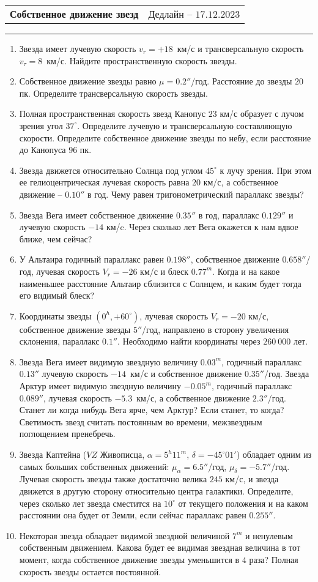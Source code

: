 \documentclass[12pt]{article}
\begin{document}
 \begin{tabularx}{\textwidth}{Xr}
  {\Large \textbf{Собственное движение звезд}} & Дедлайн -- $17.12.2023$ \\
 \end{tabularx}
 \noindent\rule{\textwidth}{0.4pt}
 \begin{enumerate}
        \item Звезда имеет лучевую скорость $v_r=+18$~км/с и трансверсальную скорость $v_{\tau}=8$~км/с. Найдите пространственную скорость звезды.
        \item Собственное движение звезды равно $\mu=0.2''$/год. Расстояние до звезды $20$ пк. Определите трансверсальную скорость звезды.
        \item Полная пространственная скорость звезд Канопус $23$ км/с образует с лучом зрения угол $37^{\circ}$. Определите лучевую и трансверсальную составляющую скорости. Определите собственное движение звезды по небу, если расстояние до Канопуса  $96$ пк.
        \item Звезда движется относительно Солнца под углом $45^{\circ}$ к лучу зрения. При этом ее гелиоцентрическая лучевая скорость равна $20$ км/с, а собственное движение -- $0.10''$ в год. Чему равен тригонометрический параллакс звезды?
        \item Звезда Вега имеет собственное движение $0.35''$ в год, параллакс $0.129''$ и лучевую скорость $-14$ км/c. Через сколько лет Вега окажется к нам вдвое ближе, чем сейчас?
        \item У Альтаира годичный параллакс равен $0.198''$, собственное движение $0.658''$/год, лучевая скорость $V_r =- 26$ км/с и блеск $0.77^m$. Когда и на какое наименьшее расстояние Альтаир сблизится с Солнцем, и каким будет тогда его видимый блеск?
        \item Координаты звезды $(0^h, +60^{\circ})$, лучевая скорость $V_r=-20$ км/с, собственное движение звезды $5''$/год, направлено в сторону увеличения склонения, параллакс $0.1''$. Необходимо найти координаты через $260~000$ лет.
        \item Звезда Вега имеет видимую звездную величину $0.03^m$, годичный параллакс $0.13''$ лучевую скорость $-14$~км/с и собственное движение $0.35''$/год. Звезда Арктур имеет видимую звездную величину $-0.05^m$, годичный параллакс $0.089''$, лучевая скорость $-5.3$~км/с, а собственное движение $2.3''$/год. Станет ли когда нибудь Вега ярче, чем Арктур?  Если станет, то когда? Светимость звезд считать постоянным во времени, межзвездным поглощением пренебречь.
        \item Звезда Каптейна ($VZ$ Живописца, $\alpha=5^h 11^m$, $\delta=-45^{\circ} 01'$) обладает одним из самых больших собственных движений: $\mu_{\alpha}=6.5''$/год, $\mu_{\delta}=-5.7''$/год. Лучевая скорость звезды также достаточно велика $245$ км/с, и звезда движется в другую сторону относительно центра галактики. Определите, через сколько лет звезда сместится на $10^{\circ}$ от текущего положения и на каком расстоянии она будет от Земли, если сейчас параллакс равен $0.255''$.
        \item Некоторая звезда обладает видимой звездной величиной $7^m$ и ненулевым собственным движением. Какова будет ее видимая звездная величина в тот момент, когда собственное движение звезды уменьшится в $4$ раза? Полная скорость звезды остается постоянной.
 \end{enumerate}
\end{document}
